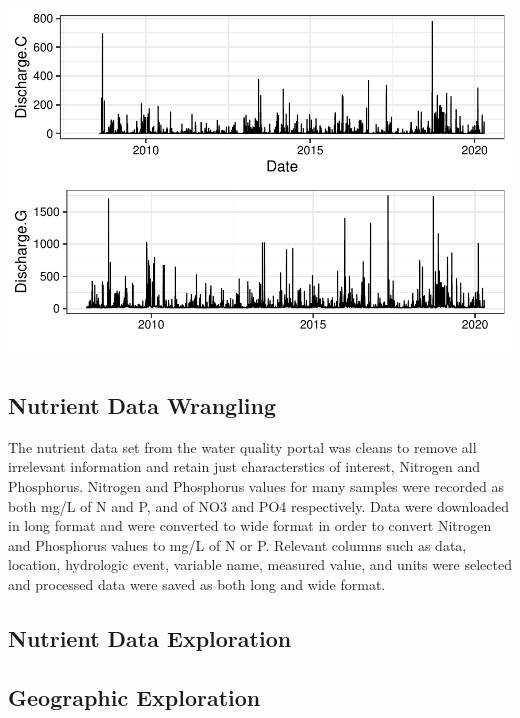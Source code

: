 \documentclass[12pt,]{article}
\begin{document}
\includegraphics{Landman_ENV872_Project_files/figure-latex/unnamed-chunk-2-3.pdf}

\hypertarget{nutrient-data-wrangling}{%
\subsection{Nutrient Data Wrangling}\label{nutrient-data-wrangling}}

The nutrient data set from the water quality portal was cleans to remove
all irrelevant information and retain just characterstics of interest,
Nitrogen and Phosphorus. Nitrogen and Phosphorus values for many samples
were recorded as both mg/L of N and P, and of NO3 and PO4 respectively.
Data were downloaded in long format and were converted to wide format in
order to convert Nitrogen and Phosphorus values to mg/L of N or P.
Relevant columns such as data, location, hydrologic event, variable
name, measured value, and units were selected and processed data were
saved as both long and wide format.

\hypertarget{nutrient-data-exploration}{%
\subsection{Nutrient Data Exploration}\label{nutrient-data-exploration}}

\hypertarget{geographic-exploration}{%
\subsection{Geographic Exploration}\label{geographic-exploration}}
\end{document}
